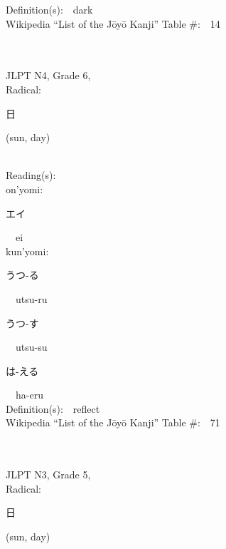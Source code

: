 \begin{multicols}{2}
Definition(s):\ \ dark \\
Wikipedia ``List of the J\=oy\=o Kanji'' Table \#:\ \ 14 \\
\ \ \\
{\fontsize{34pt}{40pt}  }\ \ \\  %
{JLPT N4, Grade 6, \\Radical:\ \ {\begin{CJK}{UTF8}{min} 日 \end{CJK}} (sun, day) } \\
Reading(s):\ \ \\
{\hspace*{1em}}on'yomi:\ \ \\
{\hspace*{2em}}{\begin{CJK}{UTF8}{min} エイ \end{CJK}}\ \ ei\ \ \\
{\hspace*{1em}}kun'yomi:\ \ \\
{\hspace*{2em}}{\begin{CJK}{UTF8}{min} うつ-る \end{CJK}}\ \ utsu-ru\ \ \\
{\hspace*{2em}}{\begin{CJK}{UTF8}{min} うつ-す \end{CJK}}\ \ utsu-su\ \ \\
{\hspace*{2em}}{\begin{CJK}{UTF8}{min} は-える \end{CJK}}\ \ ha-eru\ \ \\
Definition(s):\ \ reflect \\
Wikipedia ``List of the J\=oy\=o Kanji'' Table \#:\ \ 71 \\
\ \ \\
{\fontsize{34pt}{40pt}  }\ \ \\  %
{JLPT N3, Grade 5, \\Radical:\ \ {\begin{CJK}{UTF8}{min} 日 \end{CJK}} (sun, day) } \\

\end{multicols}
